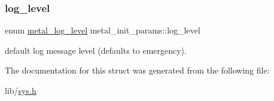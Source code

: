 \subsubsection{\texorpdfstring{log\+\_\+level}{log\_level}}
{\footnotesize\ttfamily enum \hyperlink{group__logging_ga4ffa0f4a1339af510aca7f817ee36d82}{metal\+\_\+log\+\_\+level} metal\+\_\+init\+\_\+params\+::log\+\_\+level}

default log message level (defaults to emergency). 

The documentation for this struct was generated from the following file\+:\begin{DoxyCompactItemize}
\item 
lib/\hyperlink{sys_8h}{sys.\+h}\end{DoxyCompactItemize}
